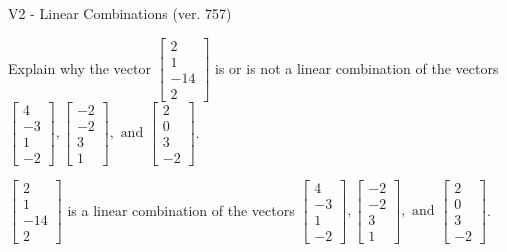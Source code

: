 \begin{exercise}
  \begin{exerciseTitle}V2 - Linear Combinations (ver. 757)\end{exerciseTitle}
  \begin{exerciseStatement}
    Explain why the vector \(\left[\begin{array}{c}
2 \\
1 \\
-14 \\
2
\end{array}\right]\)  is or is not a linear 
	combination of the vectors \(\left[\begin{array}{c}
4 \\
-3 \\
1 \\
-2
\end{array}\right] , \left[\begin{array}{c}
-2 \\
-2 \\
3 \\
1
\end{array}\right] , \text{ and } \left[\begin{array}{c}
2 \\
0 \\
3 \\
-2
\end{array}\right]\).
	


  \end{exerciseStatement}
  \begin{exerciseAnswer}
   \(\left[\begin{array}{c}
2 \\
1 \\
-14 \\
2
\end{array}\right]\) 
  	 is  
	a linear combination of the vectors \(\left[\begin{array}{c}
4 \\
-3 \\
1 \\
-2
\end{array}\right] , \left[\begin{array}{c}
-2 \\
-2 \\
3 \\
1
\end{array}\right] , \text{ and } \left[\begin{array}{c}
2 \\
0 \\
3 \\
-2
\end{array}\right]\).

	
  


  \end{exerciseAnswer}
\end{exercise}